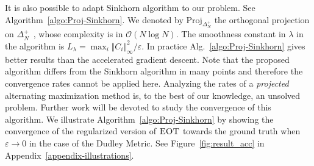 It is also possible to adapt Sinkhorn algorithm to our problem. See Algorithm~\ref{algo:Proj-Sinkhorn}. We denoted by $\mathrm{Proj}_{\Delta_N^+}$ the orthogonal projection on $\Delta_N^+$~\citep{shalev2006efficient}, whose complexity is in $\mathcal{O}(N\log{N})$.  The smoothness constant in $\lambda$ in the algorithm is $L_\lambda = \max_{i}\Vert C_i\Vert_{\infty}^2/\varepsilon$. In practice  Alg.~\ref{algo:Proj-Sinkhorn} gives better results than the accelerated gradient descent. Note that the proposed algorithm differs from the Sinkhorn algorithm in many points and therefore the convergence rates cannot be applied here. Analyzing the rates of a \emph{projected} alternating maximization method is, to the best of our knowledge, an unsolved problem. Further work will be devoted to study the convergence of this algorithm. We illustrate Algorithm~\ref{algo:Proj-Sinkhorn} by showing the convergence of the regularized version of $\textsc{EOT}$ towards the ground truth when $\varepsilon\to 0$ in the case of the Dudley Metric. See Figure~\ref{fig:result_acc} in Appendix~\ref{appendix-illustrations}.  



